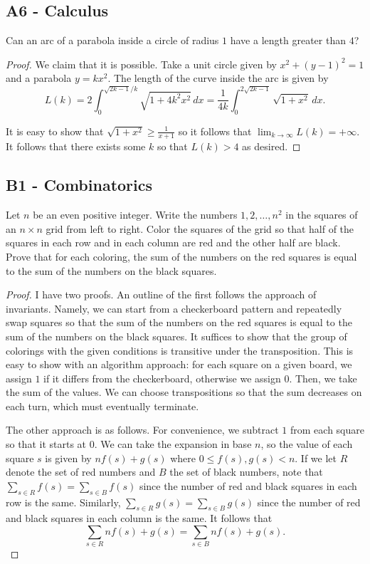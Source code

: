\documentclass[11pt]{scrartcl}
\newcommand{\<}{\langle}
\renewcommand{\>}{\rangle}
\begin{document}
\subsection{A6 - Calculus}
 Can an arc of a parabola inside a circle of radius $1$ have a length greater than $4$?

\begin{proof}
We claim that it is possible.  Take a unit circle given by $x^2 + (y-1)^2 = 1$ and a parabola $y = kx^2$.  The length of the curve inside the arc is given by 
$$L(k) = 2\int_0^{\sqrt{2k-1}/k} \sqrt{1 + 4k^2 x^2}\,dx = \frac{1}{4k} \int_0^{2\sqrt{2k-1}} \sqrt{1 + x^2} \,dx.$$

It is easy to show that $\sqrt{1 +  x^2} \ge \frac{1}{x+1}$ so it follows that $\lim_{k \to \infty} L(k) = +\infty$.  It follows that there exists some $k$ so that $L(k) > 4$ as desired.  
\end{proof}
\subsection{B1 - Combinatorics}
 Let $n$ be an even positive integer.  Write the numbers $1, 2, \dots, n^2$ in the squares of an $n \times n$ grid from left to right.  Color the squares of the grid so that half of the squares in each row and in each column are red and the other half are black.  Prove that for each coloring, the sum of the numbers on the red squares is equal to the sum of the numbers on the black squares.  

\begin{proof}
I have two proofs.  An outline of the first follows the approach of invariants.  Namely, we can start from a checkerboard pattern and repeatedly swap squares so that the sum of the numbers on the red squares is equal to the sum of the numbers on the black squares.  It suffices to show that the group of colorings with the given conditions is transitive under the transposition.  This is easy to show with an algorithm approach: for each square on a given board, we assign $1$ if it differs from the checkerboard, otherwise we assign $0$.  Then, we take the sum of the values.  We can choose transpositions so that the sum decreases on each turn, which must eventually terminate.  

The other approach is as follows.  For convenience, we subtract $1$ from each square so that it starts at $0$.  We can take the expansion in base $n$, so the value of each square $s$ is given by $nf(s) + g(s)$ where $0 \le f(s), g(s) < n$.  If we let $R$ denote the set of red numbers and $B$ the set of black numbers, note that $\sum_{s \in R} f(s) = \sum_{s \in B} f(s)$ since the number of red and black squares in each row is the same.  Similarly, $\sum_{s \in R} g(s) = \sum_{s \in B} g(s)$ since the number of red and black squares in each column is the same.  It follows that 
$$\sum_{s \in R} nf(s) + g(s) = \sum_{s \in B} nf(s) + g(s).$$
\end{proof}
\end{document}

